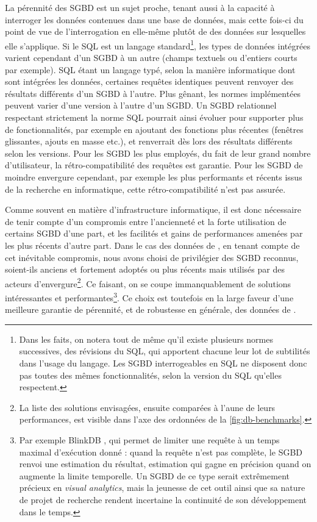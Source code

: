 La pérennité des SGBD est un sujet proche, tenant aussi à la capacité à interroger les données contenues dans une base de données, mais cette fois-ci du point de vue de l'interrogation en elle-même plutôt de des données sur lesquelles elle s'applique.
Si le SQL est un langage standard\footnote{
	Dans les faits, on notera tout de même qu'il existe plusieurs normes successives, des \og révisions\fg{} du SQL, qui apportent chacune leur lot de subtilités dans l'usage du langage.
	Les SGBD interrogeables en SQL ne disposent donc pas toutes des mêmes fonctionnalités, selon la version du SQL qu'elles respectent.
}, les types de données intégrées varient cependant d'un SGBD à un autre (champs textuels ou d'entiers \og courts\fg{} par exemple).
SQL étant un langage typé, selon la manière informatique dont sont intégrées les données, certaines requêtes identiques peuvent renvoyer des résultats différents d'un SGBD à l'autre.
Plus gênant, les normes implémentées peuvent varier d'une version à l'autre d'un SGBD.
Un SGBD relationnel respectant strictement la norme SQL pourrait ainsi évoluer pour supporter plus de fonctionnalités, par exemple en ajoutant des fonctions plus récentes (fenêtres glissantes, ajouts en masse etc.), et renverrait dès lors des résultats différents selon les versions.
Pour les SGBD les plus employés, du fait de leur grand nombre d'utilisateur, la rétro-compatibilité des requêtes est garantie.
Pour les SGBD de moindre envergure cependant, par exemple les plus performants et récents issus de la recherche en informatique, cette rétro-compatibilité n'est pas assurée.

Comme souvent en matière d'infrastructure informatique, il est donc nécessaire de tenir compte d'un compromis entre l'ancienneté et la forte utilisation de certains SGBD d'une part, et les facilités et gains de performances amenées par les plus récents d'autre part.
Dans le cas des données de \simfeodal{}, en tenant compte de cet inévitable compromis, nous avons choisi de privilégier des SGBD reconnus, soient-ils anciens et fortement adoptés ou plus récents mais utilisés par des acteurs d'envergure\footnote{
	La liste des solutions envisagées, ensuite comparées à l'aune de leurs performances, est visible dans l'axe des ordonnées de la \cref{fig:db-benchmarks}.
}.
Ce faisant, on se coupe immanquablement de solutions intéressantes et performantes\footnote{
	Par exemple BlinkDB \autocite{agarwal_blinkdb_2013}, qui permet de limiter une requête à un temps maximal d'exécution donné : quand la requête n'est pas complète, le SGBD renvoi une estimation du résultat, estimation qui gagne en précision quand on augmente la limite temporelle.
	Un SGBD de ce type serait extrêmement précieux en \textit{visual analytics}, mais la jeunesse de cet outil ainsi que sa nature de projet de recherche rendent incertaine la continuité de son développement dans le temps.
}.
Ce choix est toutefois en la large faveur d'une meilleure garantie de pérennité, et de robustesse en générale, des données de \simfeodal{}.

